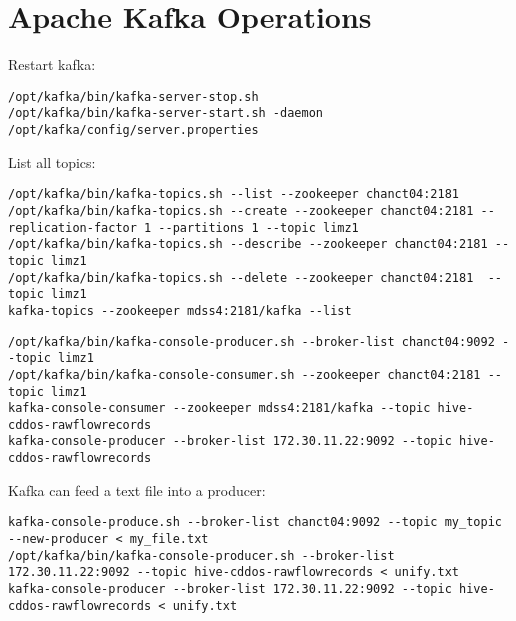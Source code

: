 \section{Apache Kafka Operations}

Restart kafka:
\begin{verbatim}
/opt/kafka/bin/kafka-server-stop.sh
/opt/kafka/bin/kafka-server-start.sh -daemon /opt/kafka/config/server.properties
\end{verbatim}

List all topics:
\begin{verbatim}
/opt/kafka/bin/kafka-topics.sh --list --zookeeper chanct04:2181
/opt/kafka/bin/kafka-topics.sh --create --zookeeper chanct04:2181 --replication-factor 1 --partitions 1 --topic limz1
/opt/kafka/bin/kafka-topics.sh --describe --zookeeper chanct04:2181 --topic limz1
/opt/kafka/bin/kafka-topics.sh --delete --zookeeper chanct04:2181  --topic limz1
kafka-topics --zookeeper mdss4:2181/kafka --list
\end{verbatim}

\begin{verbatim}
/opt/kafka/bin/kafka-console-producer.sh --broker-list chanct04:9092 --topic limz1
/opt/kafka/bin/kafka-console-consumer.sh --zookeeper chanct04:2181 --topic limz1 
kafka-console-consumer --zookeeper mdss4:2181/kafka --topic hive-cddos-rawflowrecords 
kafka-console-producer --broker-list 172.30.11.22:9092 --topic hive-cddos-rawflowrecords
\end{verbatim}

Kafka can feed a text file into a producer:
\begin{verbatim}
kafka-console-produce.sh --broker-list chanct04:9092 --topic my_topic --new-producer < my_file.txt
/opt/kafka/bin/kafka-console-producer.sh --broker-list 172.30.11.22:9092 --topic hive-cddos-rawflowrecords < unify.txt
kafka-console-producer --broker-list 172.30.11.22:9092 --topic hive-cddos-rawflowrecords < unify.txt
\end{verbatim}








